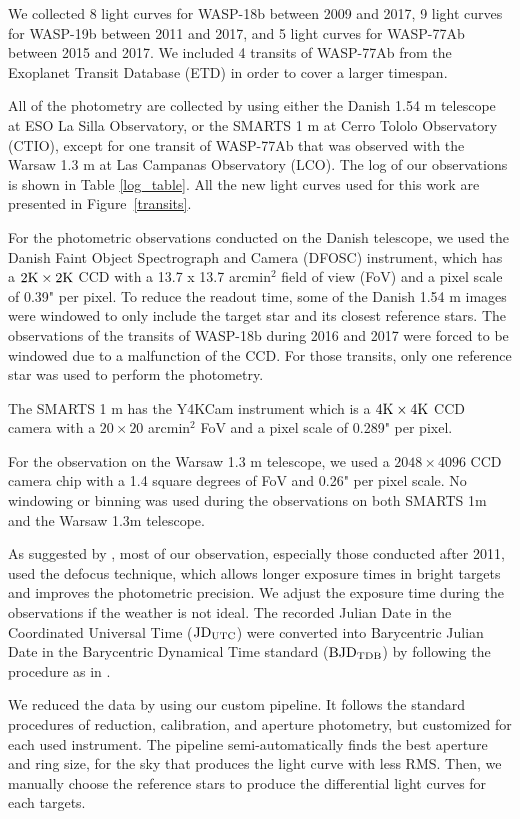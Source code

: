 We collected 8 light curves for WASP-18b between 2009 and 2017, 9 light curves for WASP-19b between 2011 and 2017, and 5 light curves for WASP-77Ab between 2015 and 2017. We included 4 transits of WASP-77Ab from the Exoplanet Transit Database (ETD) in order to cover a larger timespan.

All of the photometry are collected by using either the Danish 1.54 m telescope at ESO La Silla Observatory, or the SMARTS 1 m at Cerro Tololo Observatory (CTIO), except for one transit of WASP-77Ab that was observed with the Warsaw 1.3 m at Las Campanas Observatory (LCO). The log of our observations is shown in Table \ref{log_table}. All the new light curves used for this work are presented in Figure~\ref{transits}.

For the photometric observations conducted on the Danish telescope, we used the Danish Faint Object Spectrograph and Camera (DFOSC) instrument, which has a $2{\rm K} \times 2{\rm K}$ CCD with a 13.7 x 13.7 arcmin$^2$ field of view (FoV) and a pixel scale of 0.39" per pixel. To reduce the readout time, some of the Danish 1.54 m images were windowed to only include the target star and its closest reference stars. The observations of the transits of WASP-18b during 2016 and 2017 were forced to be windowed due to a malfunction of the CCD. For those transits, only one reference star was used to perform the photometry.

The SMARTS 1 m has the Y4KCam instrument which is a $4{\rm K} \times 4{\rm K}$ CCD camera with a $20\times20$ arcmin$^2$ FoV and a pixel scale of 0.289" per pixel. 

For the observation on the Warsaw 1.3 m telescope, we used a $2048 \times 4096$ CCD camera chip with a 1.4 square degrees of FoV and 0.26" per pixel scale. No windowing or binning was used during the observations on both SMARTS 1m and the Warsaw 1.3m telescope.

As suggested by \cite{Southworth2009}, most of our observation, especially those conducted after 2011, used the defocus technique, which allows longer exposure times in bright targets and improves the photometric precision. We adjust the exposure time during the observations if the weather is not ideal. The recorded Julian Date in the Coordinated Universal Time (${\rm JD_{UTC}}$) were converted into Barycentric Julian Date in the Barycentric Dynamical Time standard (${\rm BJD_{TDB}}$) by following the procedure as in \citet{Eastman2010}.

We reduced the data by using our custom pipeline. It follows the standard procedures of reduction, calibration, and aperture photometry, but customized for each used instrument. The pipeline semi-automatically finds the best aperture and ring size, for the sky that produces the light curve with less RMS. Then, we manually choose the reference stars to produce the differential light curves for each targets.


